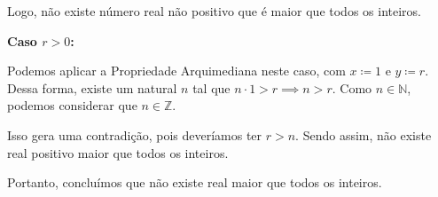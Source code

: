 \documentclass[12pt]{article}
\begin{document}
	Logo, não existe número real não positivo que é maior que todos os inteiros.
	
	\textbf{Caso $r > 0$:}
	
	Podemos aplicar a Propriedade Arquimediana neste caso, com $x \coloneq 1$ e $y \coloneq r$. Dessa forma, existe um natural $n$ tal que $n \cdot 1 > r \implies n > r$. Como $n \in \mathbb{N}$, podemos considerar que $n \in \mathbb{Z}$.
	
	Isso gera uma contradição, pois deveríamos ter $r > n$. Sendo assim, não existe real positivo maior que todos os inteiros.
	
	Portanto, concluímos que não existe real maior que todos os inteiros. \blacksquare
\end{document}
